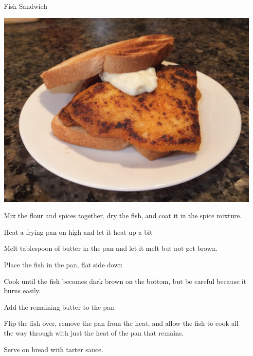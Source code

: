 \documentclass{recipe}
\begin{document}
\begin{recipe}{Fish Sandwich}

  \begin{ingredients}
    \ingredientsep
  \end{ingredients}

  \begin{images}
    \begin{image}
      \includegraphics[width=\linewidth,trim=100px 50px 0px 100px, clip=true]{fish_sandwich-01.jpeg}
    \end{image}
  \end{images}

  \begin{steps}
  \item Mix the flour and spices together, dry the fish, and coat it
    in the spice mixture.
  \item Heat a frying pan on high and let it heat up a bit
  \item Melt  tablespoon of butter in the pan and let
    it melt but not get brown.
  \item Place the fish in the pan, flat side down
  \item Cook until the fish becomes dark brown on the bottom, but be
    careful because it burns easily.
  \item Add the remaining butter to the pan
  \item Flip the fish over, remove the pan from the heat, and allow
    the fish to cook all the way through with just the heat of the pan
    that remains.
  \item Serve on bread with tarter sauce.
  \end{steps}
\end{recipe}
\end{document}
